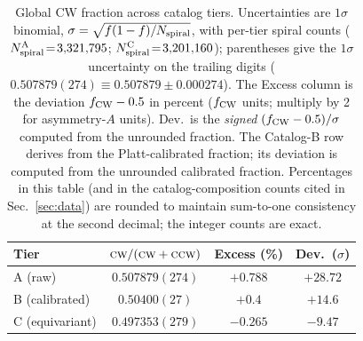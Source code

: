 \documentclass[aps,prd,twocolumn,superscriptaddress,preprintnumbers,nofootinbib,longbibliography,floatfix]{revtex4-2}
\newcommand{\CW}{\textsc{cw}}
\newcommand{\CCW}{\textsc{ccw}}
\newcommand{\sigmaunit}{\sigma}
\begin{document}
\begin{table}[t]
\caption{Global CW fraction across catalog tiers. Uncertainties are $1\sigmaunit$ binomial, $\sigma=\sqrt{f(1-f)/N_{\rm spiral}}$, with per-tier spiral counts ($N_{\rm spiral}^{\rm A}\!=\!3{,}321{,}795$; $N_{\rm spiral}^{\rm C}\!=\!3{,}201{,}160$); parentheses give the $1\sigmaunit$ uncertainty on the trailing digits ($0.507879(274)\equiv0.507879\pm0.000274$). The Excess column is the deviation $f_{\rm CW}-0.5$ in percent ($f_{\rm CW}$ units; multiply by 2 for asymmetry-$A$ units). Dev.\ is the \emph{signed} $(f_{\rm CW}-0.5)/\sigma$ computed from the unrounded fraction. The Catalog-B row derives from the Platt-calibrated fraction; its deviation is computed from the unrounded calibrated fraction. Percentages in this table (and in the catalog-composition counts cited in Sec.~\ref{sec:data}) are rounded to maintain sum-to-one consistency at the second decimal; the integer counts are exact. \label{tab:cw_frac}}
\begin{ruledtabular}
\begin{tabular}{lccc}
\textbf{Tier} & \textbf{$\CW/(\CW+\CCW)$} & \textbf{Excess (\%)} & \textbf{Dev.\ ($\sigmaunit$)} \\
\hline
A (raw) & $0.507879(274)$ & $+0.788$ & $+28.72$ \\
B (calibrated) & $0.50400(27)$ & $+0.4$ & $+14.6$ \\
C (equivariant) & $0.497353(279)$ & $-0.265$ & $-9.47$ \\
\end{tabular}
\end{ruledtabular}
\end{table}
\end{document}
